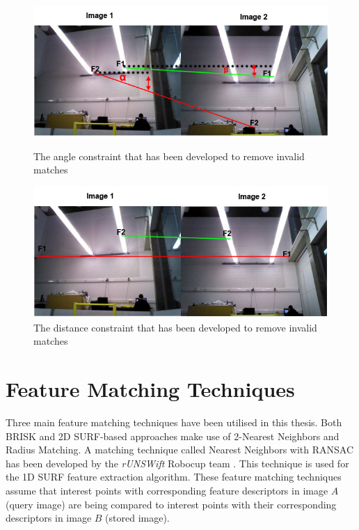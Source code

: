 \documentclass[11pt]{report}
\begin{document}
\begin{figure}[ht!]
\begin{minipage}[b]{0.5\linewidth}
  \centering
    \includegraphics[width=1.0\textwidth]{../Drawings/constraints/angleConstraintMerged.jpg}
    \caption{The angle constraint that has been developed to remove invalid matches} 
    \label{fig:angleConstraint}
\end{minipage}
\begin{minipage}[b]{0.5\linewidth}
  \centering
    \includegraphics[width=1.0\textwidth]{../Drawings/constraints/distanceConstraint.jpg}
    \caption{The distance constraint that has been developed to remove invalid matches} 
    \label{fig:distanceConstraint}
\end{minipage}
\end{figure}



\section{Feature Matching Techniques}
\label{sec:matchingTechniques}
Three main feature matching techniques have been utilised in this thesis. Both BRISK and 2D SURF-based approaches make use of 2-Nearest Neighbors and Radius Matching. A matching technique called Nearest Neighbors with RANSAC has been developed by the \textit{rUNSWift} Robocup team \cite{Anderson}. This technique is used for the 1D SURF feature extraction algorithm. These feature matching techniques assume that interest points with corresponding feature descriptors in image $A$ (query image) are being compared to interest points with their corresponding descriptors in image $B$ (stored image). \\
\end{document}
